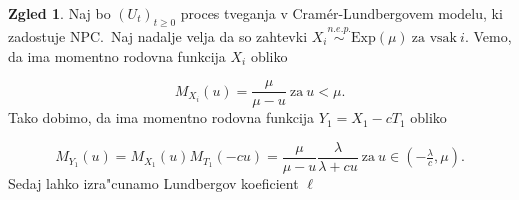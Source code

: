 \documentclass[12pt, a4paper, reqno]{amsart}
\theoremstyle{definition}
\newtheorem{zgled}[definicija]{Zgled}
\theoremstyle{plain}
\newcommand{\1}{\mathds{1}}
\begin{document}
            \begin{zgled}
                Naj bo $(U_t)_{t\geq0}$ proces tveganja v Cramér-Lundbergovem modelu, ki zadostuje NPC.\ Naj 
                nadalje velja da so zahtevki
                $X_i \stackrel{n.e.p.}{\sim} \text{Exp}(\mu) \ \text{za vsak} \ i$. Vemo, da ima momentno rodovna funkcija 
                $X_i$ obliko 

                \begin{equation*}
                    M_{X_i}(u) = \frac{\mu}{\mu - u} \ \text{za} \ u<\mu.
                \end{equation*}
                Tako dobimo, da ima momentno rodovna funkcija $Y_1 = X_1 - cT_1$ obliko 

                \begin{equation*}
                    M_{Y_1}(u) = M_{X_1}(u)M_{T_1}(-cu) = 
                    \frac{\mu}{\mu - u}\frac{\lambda}{\lambda + cu} \ \text{za} \ u\in (-\tfrac{\lambda}{c}, \mu).
                \end{equation*}
                Sedaj lahko izra"cunamo Lundbergov koeficient $\ell$


\end{zgled}
\end{document}
